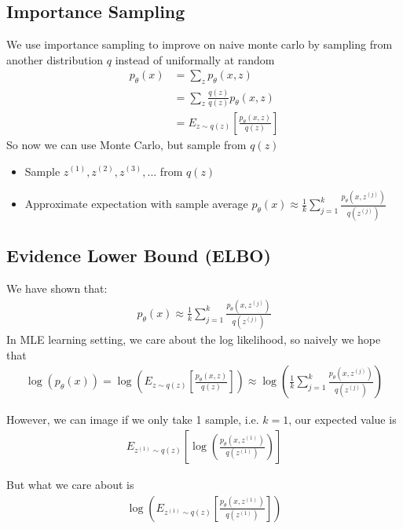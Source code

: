 \subsection{Importance Sampling} 
We use importance sampling to improve on naive monte carlo by sampling from another distribution $q$ instead of uniformally at random
    \begin{align*}
        p_\theta(x) 
        & = \sum_{z} p_\theta(x,z) \\
        & = \sum_{z} \frac{q(z)}{q(z)} p_\theta(x,z) \\
        & = E_{z\sim q(z)} [\frac{p_\theta(x,z)}{q(z)}]
    \end{align*}
So now we can use Monte Carlo, but sample from $q(z)$ 
    \begin{itemize}
        \item Sample $z^{(1)}, z^{(2)}, z^{(3)}, ...$ from $q(z)$
        \item Approximate expectation with sample average $p_\theta(x) \approx \frac{1}{k} \sum_{j=1}^{k} \frac{p_\theta(x, z^{(j)})}{q(z^{(j)})}$
    \end{itemize}
    
    
\subsection{Evidence Lower Bound (ELBO)} 
We have shown that: 
    \begin{align*}
        p_\theta(x) \approx \frac{1}{k} \sum_{j=1}^{k} \frac{p_\theta(x, z^{(j)})}{q(z^{(j)})}
    \end{align*}
In MLE learning setting, we care about the log likelihood, so naively we hope that 
    \begin{align*}
        \log(p_\theta(x)) = \log \left(  E_{z\sim q(z)} [\frac{p_\theta(x,z)}{q(z)}] \right) \approx  \log \left( \frac{1}{k} \sum_{j=1}^{k} \frac{p_\theta(x, z^{(j)})}{q(z^{(j)})} \right)
    \end{align*}

However, we can image if we only take 1 sample, i.e. $k = 1$, our expected value is 
    \begin{align*}
        E_{z^{(1)} \sim q(z)}[\log (\frac{p_\theta(x, z^{(1)})}{q(z^{(1)})})]
    \end{align*}

But what we care about is 
    \begin{align*}
        \log\left(E_{z^{(1)} \sim q(z)}[\frac{p_\theta(x, z^{(1)})}{q(z^{(1)})}]\right)
    \end{align*}

